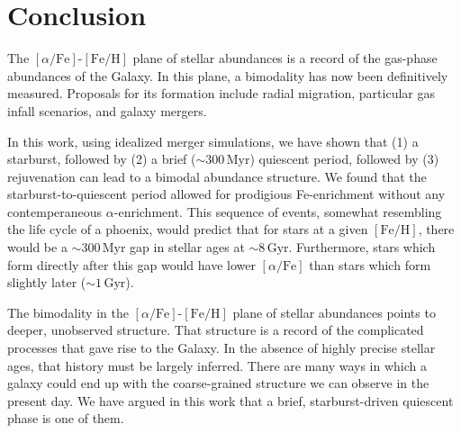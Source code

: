 \documentclass[twocolumn,linenumbers,trackchanges]{aastex631}
\newcommand{\Gyr}{\ensuremath{\textrm{Gyr}}}
\newcommand{\Myr}{\ensuremath{\textrm{Myr}}}
\newcommand{\FeH}{\ensuremath{[\textrm{Fe}/\textrm{H}]}}
\newcommand{\alphaFe}{\ensuremath{[\alpha/\textrm{Fe}]}}
\begin{document}
\section{Conclusion}\label{sec:conclusion}
The \alphaFe{}-\FeH{} plane of stellar abundances is a record of the gas-phase abundances of the Galaxy. In this plane, a bimodality has now been definitively measured. Proposals for its formation include radial migration, particular gas infall scenarios, and galaxy mergers.

In this work, using idealized merger simulations, we have shown that (1) a starburst, followed by (2) a brief ($\sim300\,\Myr$) quiescent period, followed by (3) rejuvenation can lead to a bimodal abundance structure. We found that the starburst-to-quiescent period allowed for prodigious Fe-enrichment without any contemperaneous $\alpha$-enrichment. This sequence of events, somewhat resembling the life cycle of a phoenix, would predict that for stars at a given \FeH{}, there would be a $\sim300\,\Myr$ gap in stellar ages at $\sim8\,\Gyr$. Furthermore, stars which form directly after this gap would have lower \alphaFe{} than stars which form slightly later ($\sim1\,\Gyr$).

The bimodality in the \alphaFe{}-\FeH{} plane of stellar abundances points to deeper, unobserved structure. That structure is a record of the complicated processes that gave rise to the Galaxy. In the absence of highly precise stellar ages, that history must be largely inferred. There are many ways in which a galaxy could end up with the coarse-grained structure we can observe in the present day. We have argued in this work that a brief, starburst-driven quiescent phase is one of them.
\end{document}

